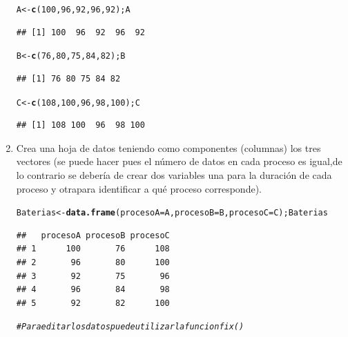\documentclass[12pt,letterpaper]{article}\usepackage[]{graphicx}\usepackage[]{color}
\makeatletter
\newcommand{\hlnum}[1]{\textcolor[rgb]{0.686,0.059,0.569}{#1}}%
\newcommand{\hlcom}[1]{\textcolor[rgb]{0.678,0.584,0.686}{\textit{#1}}}%
\newcommand{\hlstd}[1]{\textcolor[rgb]{0.345,0.345,0.345}{#1}}%
\newcommand{\hlkwb}[1]{\textcolor[rgb]{0.69,0.353,0.396}{#1}}%
\newcommand{\hlkwc}[1]{\textcolor[rgb]{0.333,0.667,0.333}{#1}}%
\newcommand{\hlkwd}[1]{\textcolor[rgb]{0.737,0.353,0.396}{\textbf{#1}}}%
\newenvironment{kframe}{%
 \def\at@end@of@kframe{}%
 \ifinner\ifhmode%
  \def\at@end@of@kframe{\end{minipage}}%
  \begin{minipage}{\columnwidth}%
 \fi\fi%
 \def\FrameCommand##1{\hskip\@totalleftmargin \hskip-\fboxsep
 \colorbox{shadecolor}{##1}\hskip-\fboxsep
     \hskip-\linewidth \hskip-\@totalleftmargin \hskip\columnwidth}%
 \MakeFramed {\advance\hsize-\width
   \@totalleftmargin\z@ \linewidth\hsize
   \@setminipage}}%
 {\par\unskip\endMakeFramed%
 \at@end@of@kframe}
\newenvironment{knitrout}{}{} %
\makeatother
\begin{document}
\begin{enumerate}
\begin{knitrout}
\color{fgcolor}\begin{kframe}
\begin{alltt}
\hlstd{A} \hlkwb{<-} \hlkwd{c}\hlstd{(}\hlnum{100}\hlstd{,}\hlnum{96}\hlstd{,}\hlnum{92}\hlstd{,}\hlnum{96}\hlstd{,}\hlnum{92}\hlstd{); A}
\end{alltt}
\begin{verbatim}
## [1] 100  96  92  96  92
\end{verbatim}
\begin{alltt}
\hlstd{B} \hlkwb{<-} \hlkwd{c}\hlstd{(}\hlnum{76}\hlstd{,}\hlnum{80}\hlstd{,}\hlnum{75}\hlstd{,}\hlnum{84}\hlstd{,}\hlnum{82}\hlstd{); B}
\end{alltt}
\begin{verbatim}
## [1] 76 80 75 84 82
\end{verbatim}
\begin{alltt}
\hlstd{C} \hlkwb{<-} \hlkwd{c}\hlstd{(}\hlnum{108}\hlstd{,}\hlnum{100}\hlstd{,}\hlnum{96}\hlstd{,}\hlnum{98}\hlstd{,}\hlnum{100}\hlstd{); C}
\end{alltt}
\begin{verbatim}
## [1] 108 100  96  98 100
\end{verbatim}
\end{kframe}
\end{knitrout}

\item  Crea una hoja de datos teniendo como componentes (columnas) los tres vectores (se puede hacer pues el n\'umero de datos en cada proceso es igual,de lo contrario se deber\'ia de crear dos variables una para la duraci\'on de cada proceso y otrapara identificar a qu\'e proceso corresponde).

\begin{knitrout}
\color{fgcolor}\begin{kframe}
\begin{alltt}
\hlstd{Baterias} \hlkwb{<-} \hlkwd{data.frame}\hlstd{(}\hlkwc{procesoA}\hlstd{=A,} \hlkwc{procesoB}\hlstd{=B,} \hlkwc{procesoC}\hlstd{=C); Baterias}
\end{alltt}
\begin{verbatim}
##   procesoA procesoB procesoC
## 1      100       76      108
## 2       96       80      100
## 3       92       75       96
## 4       96       84       98
## 5       92       82      100
\end{verbatim}
\begin{alltt}
\hlcom{# Para editar los datos puede utilizar la funcion fix() }


\end{alltt}
\end{kframe}
\end{knitrout}
\end{enumerate}
\end{document}
